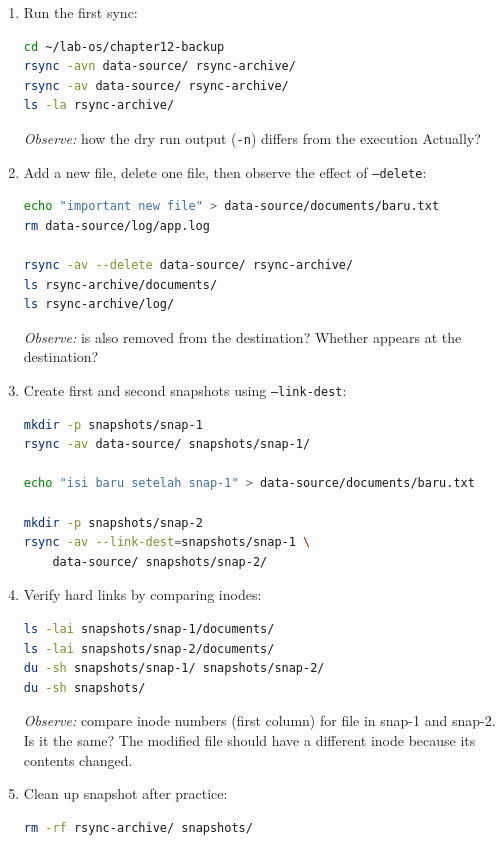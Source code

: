 \begin{enumerate}
\item Run the first sync:
\begin{lstlisting}[language=bash, caption={First sync with rsync}]
cd ~/lab-os/chapter12-backup
rsync -avn data-source/ rsync-archive/
rsync -av data-source/ rsync-archive/
ls -la rsync-archive/
\end{lstlisting}
\textit{Observe:} how the dry run output (\texttt{-n}) differs from the execution
Actually?

\item Add a new file, delete one file, then observe the effect of \texttt{--delete}:
\begin{lstlisting}[language=bash, caption={Observing the effect of --delete on rsync}]
echo "important new file" > data-source/documents/baru.txt
rm data-source/log/app.log

rsync -av --delete data-source/ rsync-archive/
ls rsync-archive/documents/
ls rsync-archive/log/
\end{lstlisting}
\textit{Observe:} is  also removed from the destination? Whether
 appears at the destination?

\item Create first and second snapshots using \texttt{--link-dest}:
\begin{lstlisting}[language=bash, caption={Create two hard link based snapshots}]
mkdir -p snapshots/snap-1
rsync -av data-source/ snapshots/snap-1/

echo "isi baru setelah snap-1" > data-source/documents/baru.txt

mkdir -p snapshots/snap-2
rsync -av --link-dest=snapshots/snap-1 \
    data-source/ snapshots/snap-2/
\end{lstlisting}

\item Verify hard links by comparing inodes:
\begin{lstlisting}[language=bash, caption={Verify hard links between snapshots}]
ls -lai snapshots/snap-1/documents/
ls -lai snapshots/snap-2/documents/
du -sh snapshots/snap-1/ snapshots/snap-2/
du -sh snapshots/
\end{lstlisting}
\textit{Observe:} compare inode numbers (first column) for file 
in snap-1 and snap-2. Is it the same? The modified file \file{baru.txt} should have a different inode because its contents changed.

\item Clean up snapshot after practice:
\begin{lstlisting}[language=bash, caption={Cleaning the snapshot directory}]
rm -rf rsync-archive/ snapshots/
\end{lstlisting}
\end{enumerate}

